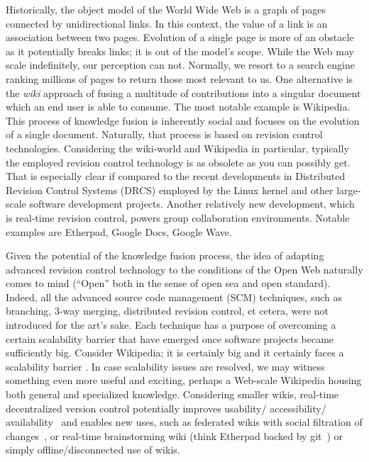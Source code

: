 \documentclass{sig-alternate}
\begin{document}
Historically, the object model of the World Wide Web is a graph of pages connected by unidirectional links.
In this context, the value of a link is an association between two pages.
Evolution of a single page is more of an obstacle as it potentially breaks links; it is out of the model's scope.
While the Web may scale indefinitely, our perception can not. 
Normally, we resort to a search engine ranking millions of pages to return those most relevant to us.
One alternative is the \emph{wiki} approach of fusing a multitude of contributions  into a singular document which an end user is able to consume.
The most notable example is Wikipedia.
This process of knowledge fusion is inherently social and focuses on the evolution of a single document.
Naturally, that process is based on revision control technologies.
Considering the wiki-world and Wikipedia in particular, typically the employed revision control technology is as obsolete as you can possibly get.
That is especially clear if compared to the recent developments in Distributed Revision Control Systems (DRCS) employed by the Linux kernel and other large-scale software development projects.
Another relatively new development, which is real-time revision control, powers group collaboration environments. Notable examples are Etherpad, Google Docs, Google Wave.

Given the potential of the knowledge fusion process, the idea of adapting advanced revision control technology to the conditions of the Open Web naturally comes to mind (``Open'' both in the sense of open sea and open standard). 
Indeed, all the advanced source code management (SCM) techniques, such as branching, 3-way merging, distributed revision control, et cetera, were not introduced for the art's sake.
Each technique has a purpose of overcoming a certain scalability barrier that have emerged once software projects became sufficiently big. 
Consider Wikipedia; it is certainly big and it certainly faces a scalability barrier \cite{no-singularity, wp-decay}.
In case scalability issues are resolved, we may witness something even more useful and exciting, perhaps  a Web-scale Wikipedia housing both general and specialized knowledge.
Considering smaller wikis, real-time decentralized version control potentially improves usability/ accessibility/ availability~\cite{nahaboo} and enables new uses, such as federated wikis with social filtration of changes~\cite{www06}, or real-time brainstorming wiki (think Etherpad backed by git~\cite{git}) or simply offline/disconnected use of wikis.
\end{document}
